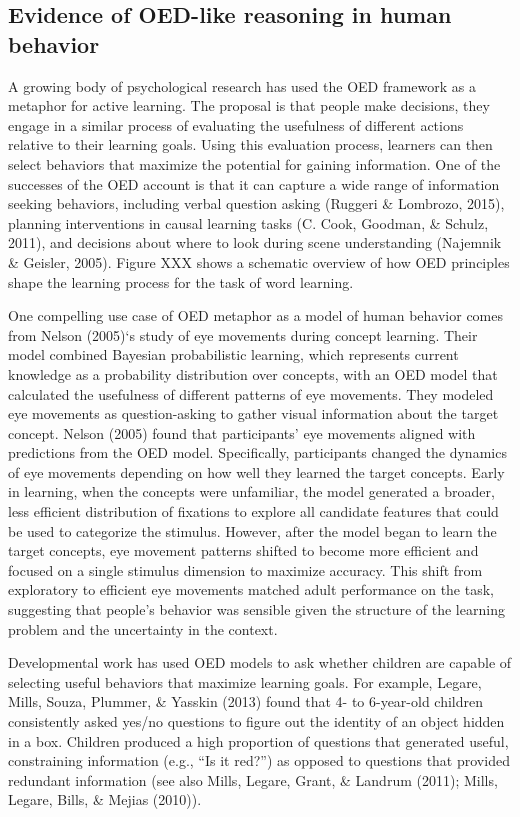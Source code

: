 \documentclass[oneside]{report}
\begin{document}
\subsection{Evidence of OED-like reasoning in human
behavior}\label{evidence-of-oed-like-reasoning-in-human-behavior}

A growing body of psychological research has used the OED framework as a
metaphor for active learning. The proposal is that people make
decisions, they engage in a similar process of evaluating the usefulness
of different actions relative to their learning goals. Using this
evaluation process, learners can then select behaviors that maximize the
potential for gaining information. One of the successes of the OED
account is that it can capture a wide range of information seeking
behaviors, including verbal question asking (Ruggeri \& Lombrozo, 2015),
planning interventions in causal learning tasks (C. Cook, Goodman, \&
Schulz, 2011), and decisions about where to look during scene
understanding (Najemnik \& Geisler, 2005). Figure XXX shows a schematic
overview of how OED principles shape the learning process for the task
of word learning.

One compelling use case of OED metaphor as a model of human behavior
comes from Nelson (2005)`s study of eye movements during concept
learning. Their model combined Bayesian probabilistic learning, which
represents current knowledge as a probability distribution over
concepts, with an OED model that calculated the usefulness of different
patterns of eye movements. They modeled eye movements as question-asking
to gather visual information about the target concept. Nelson (2005)
found that participants' eye movements aligned with predictions from the
OED model. Specifically, participants changed the dynamics of eye
movements depending on how well they learned the target concepts. Early
in learning, when the concepts were unfamiliar, the model generated a
broader, less efficient distribution of fixations to explore all
candidate features that could be used to categorize the stimulus.
However, after the model began to learn the target concepts, eye
movement patterns shifted to become more efficient and focused on a
single stimulus dimension to maximize accuracy. This shift from
exploratory to efficient eye movements matched adult performance on the
task, suggesting that people's behavior was sensible given the structure
of the learning problem and the uncertainty in the context.

Developmental work has used OED models to ask whether children are
capable of selecting useful behaviors that maximize learning goals. For
example, Legare, Mills, Souza, Plummer, \& Yasskin (2013) found that 4-
to 6-year-old children consistently asked yes/no questions to figure out
the identity of an object hidden in a box. Children produced a high
proportion of questions that generated useful, constraining information
(e.g., ``Is it red?'') as opposed to questions that provided redundant
information (see also Mills, Legare, Grant, \& Landrum (2011); Mills,
Legare, Bills, \& Mejias (2010)).
\end{document}
